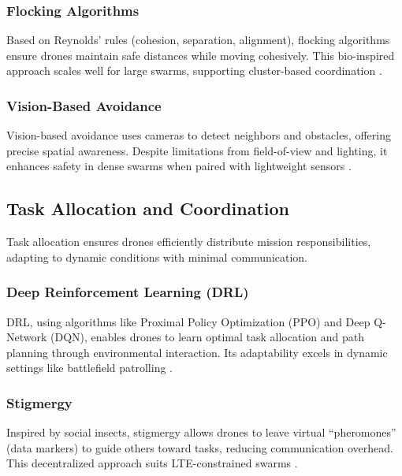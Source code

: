 \documentclass{article}
\begin{document}
\subsubsection{Flocking Algorithms}
Based on Reynolds’ rules (cohesion, separation, alignment), flocking algorithms ensure drones maintain safe distances while moving cohesively. This bio-inspired approach scales well for large swarms, supporting cluster-based coordination \cite{Reynolds1987, OlfatiSaber2006}.

\subsubsection{Vision-Based Avoidance}
Vision-based avoidance uses cameras to detect neighbors and obstacles, offering precise spatial awareness. Despite limitations from field-of-view and lighting, it enhances safety in dense swarms when paired with lightweight sensors \cite{Ross2018, Wang2020}.

\subsection{Task Allocation and Coordination}
Task allocation ensures drones efficiently distribute mission responsibilities, adapting to dynamic conditions with minimal communication.

\subsubsection{Deep Reinforcement Learning (DRL)}
DRL, using algorithms like Proximal Policy Optimization (PPO) and Deep Q-Network (DQN), enables drones to learn optimal task allocation and path planning through environmental interaction. Its adaptability excels in dynamic settings like battlefield patrolling \cite{Mnih2015, Schulman2017}.

\subsubsection{Stigmergy}
Inspired by social insects, stigmergy allows drones to leave virtual ``pheromones'' (data markers) to guide others toward tasks, reducing communication overhead. This decentralized approach suits LTE-constrained swarms \cite{Theraulaz1999, Beckers2000}.
\end{document}
